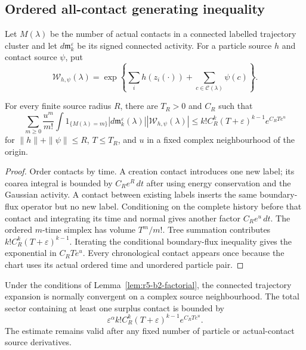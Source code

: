 \subsection{Ordered all-contact generating inequality}

Let \(M(\lambda)\) be the number of actual contacts in a connected labelled
trajectory cluster and let \(d{\mathfrak m}_{k}^{\varepsilon}\) be its signed
connected activity.  For a particle source \(h\) and contact source \(\psi\),
put
\[
 {\mathcal W}_{h,\psi}(\lambda)
 =\exp\left\{\sum_i h(z_i(\cdot))
             +\sum_{c\in{\mathcal C}(\lambda)}\psi(c)\right\}.
\]

\begin{lemma}
\label{lem:r5-b2-factorial}
For every finite source radius \(R\), there are \(T_R>0\) and \(C_R\) such
that
\[
 \sum_{m\ge0}\frac{u^m}{m!}
 \int 1_{\{M(\lambda)=m\}}
 |d{\mathfrak m}_{k}^{\varepsilon}(\lambda)|
 |{\mathcal W}_{h,\psi}(\lambda)|
 \le
 k!C_R^k(T+\varepsilon)^{k-1}
 e^{C_RT e^u}
\]
for \(\|h\|+\|\psi\|\le R\), \(T\le T_R\), and \(u\) in a fixed complex
neighbourhood of the origin.
\end{lemma}

\begin{proof}
Order contacts by time.  A creation contact introduces one new label; its
coarea integral is bounded by \(C_Re^R\,dt\) after using energy conservation
and the Gaussian activity.  A contact between existing labels inserts the
same boundary-flux operator but no new label.  Conditioning on the complete
history before that contact and integrating its time and normal gives another
factor \(C_Re^u\,dt\).  The ordered \(m\)-time simplex has volume \(T^m/m!\).
Tree summation contributes \(k!C_R^k(T+\varepsilon)^{k-1}\).  Iterating the
conditional boundary-flux inequality gives the exponential in
\(C_RT e^u\).  Every chronological contact appears once because the chart
uses its actual ordered time and unordered particle pair.
\end{proof}

\begin{theorem}
\label{thm:r5-b2-cumulant}
Under the conditions of Lemma~\ref{lem:r5-b2-factorial}, the connected
trajectory expansion is normally convergent on a complex source
neighbourhood.  The total sector containing at least one surplus contact is
bounded by
\[
 \varepsilon^\alpha
 k!C_R^k(T+\varepsilon)^{k-1}e^{C_RT e^u}.
\]
The estimate remains valid after any fixed number of particle or actual-contact
source derivatives.
\end{theorem}

